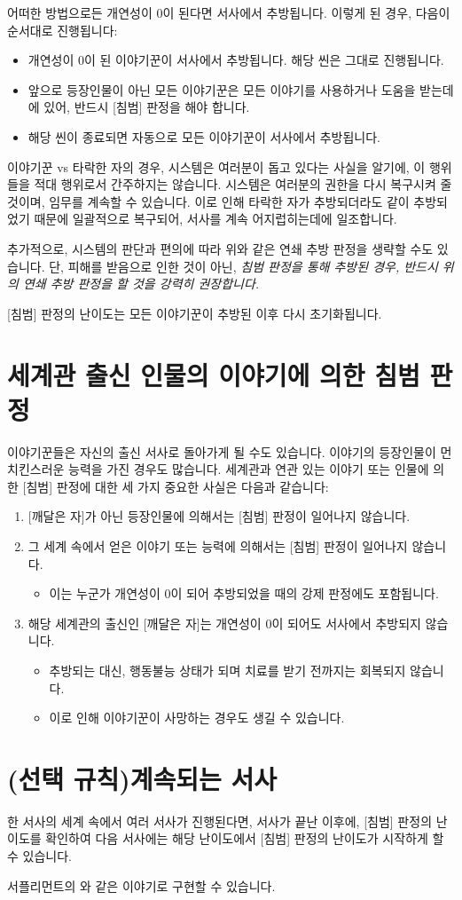 \documentclass{report}
\begin{document}
	어떠한 방법으로든 개연성이 0이 된다면 서사에서 추방됩니다. 이렇게 된 경우, 다음이 순서대로 진행됩니다:
	\begin{itemize}
		\item 개연성이 0이 된 이야기꾼이 서사에서 추방됩니다. 해당 씬은 그대로 진행됩니다.
		\item 앞으로 등장인물이 아닌 모든 이야기꾼은 모든 이야기를 사용하거나 도움을 받는데에 있어, 반드시 [침범] 판정을 해야 합니다.
		\item 해당 씬이 종료되면 자동으로 모든 이야기꾼이 서사에서 추방됩니다.
	\end{itemize}
	
	이야기꾼 vs 타락한 자의 경우, 시스템은 여러분이 돕고 있다는 사실을 알기에, 이 행위들을 적대 행위로서 간주하지는 않습니다. 시스템은 여러분의 권한을 다시 복구시켜 줄 것이며, 임무를 계속할 수 있습니다. 이로 인해 타락한 자가 추방되더라도 같이 추방되었기 때문에 일괄적으로 복구되어, 서사를 계속 어지럽히는데에 일조합니다.
	
	추가적으로, 시스템의 판단과 편의에 따라 위와 같은 연쇄 추방 판정을 생략할 수도 있습니다. 단, 피해를 받음으로 인한 것이 아닌, \emph{침범 판정을 통해 추방된 경우, 반드시 위의 연쇄 추방 판정을 할 것을 강력히 권장합니다.}
	
	[침범] 판정의 난이도는 모든 이야기꾼이 추방된 이후 다시 초기화됩니다.
	
	\section*{세계관 출신 인물의 이야기에 의한 침범 판정}
	이야기꾼들은 자신의 출신 서사로 돌아가게 될 수도 있습니다. 이야기의 등장인물이 먼치킨스러운 능력을 가진 경우도 많습니다. 세계관과 연관 있는 이야기 또는 인물에 의한 [침범] 판정에 대한 세 가지 중요한 사실은 다음과 같습니다:
	\begin{enumerate}
		\item {}[깨달은 자]가 아닌 등장인물에 의해서는 [침범] 판정이 일어나지 않습니다.
		\item 그 세계 속에서 얻은 이야기 또는 능력에 의해서는 [침범] 판정이 일어나지 않습니다.
		\begin{itemize}
			\item 이는 누군가 개연성이 0이 되어 추방되었을 때의 강제 판정에도 포함됩니다.
		\end{itemize}
		\item 해당 세계관의 출신인 [깨달은 자]는 개연성이 0이 되어도 서사에서 추방되지 않습니다.
		\begin{itemize}
			\item 추방되는 대신, 행동불능 상태가 되며 치료를 받기 전까지는 회복되지 않습니다.
			\item 이로 인해 이야기꾼이 사망하는 경우도 생길 수 있습니다.
		\end{itemize}
	\end{enumerate}
	
	\ifprintout\else
	\section*{\hypertarget{the-story-continues}{(선택 규칙)계속되는 서사}}
	한 서사의 세계 속에서 여러 서사가 진행된다면, 서사가 끝난 이후에, [침범] 판정의 난이도를 확인하여 다음 서사에는 해당 난이도에서 [침범] 판정의 난이도가 시작하게 할 수 있습니다.
	
	서플리먼트의 와 같은 이야기로 구현할 수 있습니다.
	\fi
\end{document}
